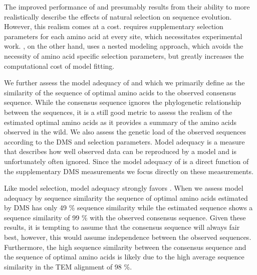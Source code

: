 The improved performance of \phydms and \selac presumably results from their ability to more realistically describe the effects of natural selection on sequence evolution.
However, this realism comes at a cost. 
\phydms requires supplementary selection parameters for each amino acid at every site, which necessitates experimental work.
\selac, on the other hand, uses a nested modeling approach, which avoids the necessity of amino acid specific selection parameters, but greatly increases the computational cost of model fitting.

We further assess the model adequacy of \phydms and \selac which we primarily define as the similarity of the sequence of optimal amino acids to the observed consensus sequence.
While the consensus sequence ignores the phylogenetic relationship between the sequences, it is a still good metric to assess the realism of the estimated optimal amino acids as it provides a summary of the amino acids observed in the wild.
We also assess the genetic load of the observed sequences according to the DMS and \selac selection parameters.
Model adequacy is a measure that describes how well observed data can be reproduced by a model and is unfortunately often ignored.
Since the model adequacy of \phydms is a direct function of the supplementary DMS measurements we focus directly on these measurements.

Like model selection, model adequacy strongly favors \selac.
When we assess model adequacy by sequence similarity the sequence of optimal amino acids estimated by DMS has only 49 \% sequence similarity while the \selac estimated sequence shows a sequence similarity of 99 \% with the observed consensus sequence.
Given these results, it is tempting to assume that the consensus sequence will always fair best, however, this would assume independence between the observed sequences.
Furthermore, the high sequence similarity between the consensus sequence and the sequence of optimal amino acids is likely due to the high average sequence similarity in the TEM alignment of 98 \%.

